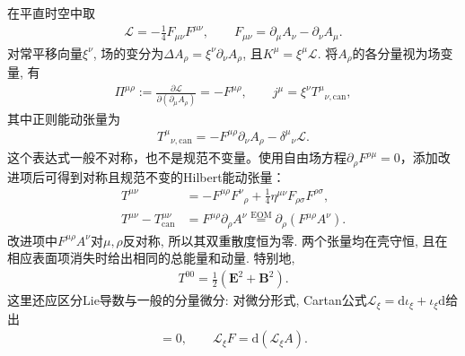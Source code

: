 \begin{example}[自由电磁场的时空平移对称性]
    在平直时空中取
    \begin{align}
        \mathcal L=-\frac14F_{\mu\nu}F^{\mu\nu},
        \qquad F_{\mu\nu}=\partial_\mu A_\nu-\partial_\nu A_\mu.
    \end{align}
    对常平移向量$\xi^\nu$, 场的变分为$\Delta A_\rho=\xi^\nu\partial_\nu A_\rho$, 且$K^\mu=\xi^\mu\mathcal L$. 将$A_\rho$的各分量视为场变量, 有
    \begin{align}
        \Pi^{\mu\rho}:=\frac{\partial\mathcal L}{\partial(\partial_\mu A_\rho)}=-F^{\mu\rho},
        \qquad j^\mu=\xi^\nu T^\mu{}_{\nu,\mathrm{can}},
    \end{align}
    其中正则能动张量为
    \begin{align}
        T^\mu{}_{\nu,\mathrm{can}}
        =-F^{\mu\rho}\partial_\nu A_\rho-\delta^\mu{}_{\nu}\mathcal L.
    \end{align}
    这个表达式一般不对称，也不是规范不变量。使用自由场方程$\partial_\rho F^{\rho\mu}=0$，添加改进项后可得到对称且规范不变的Hilbert能动张量：
    \begin{align}
        T^{\mu\nu}
        &=-F^{\mu\rho}F^\nu{}_{\rho}
          +\frac14\eta^{\mu\nu}F_{\rho\sigma}F^{\rho\sigma},\\
        T^{\mu\nu}-T_{\mathrm{can}}^{\mu\nu}
        &=F^{\mu\rho}\partial_\rho A^\nu
          \overset{\mathrm{EOM}}{=}\partial_\rho(F^{\mu\rho}A^\nu).
    \end{align}
    改进项中$F^{\mu\rho}A^\nu$对$\mu,\rho$反对称, 所以其双重散度恒为零. 两个张量均在壳守恒, 且在相应表面项消失时给出相同的总能量和动量. 特别地,
    \begin{align}
        T^{00}=\frac12(\boldsymbol E^2+\boldsymbol B^2).
    \end{align}
    这里还应区分Lie导数与一般的分量微分: 对微分形式, Cartan公式$\mathscr L_\xi=\mathrm d\iota_\xi+\iota_\xi\mathrm d$给出
    \begin{align}
        [\mathscr L_\xi,\mathrm d]=0,
        \qquad \mathscr L_\xi F=\mathrm d(\mathscr L_\xi A).
    \end{align}
\end{example}

